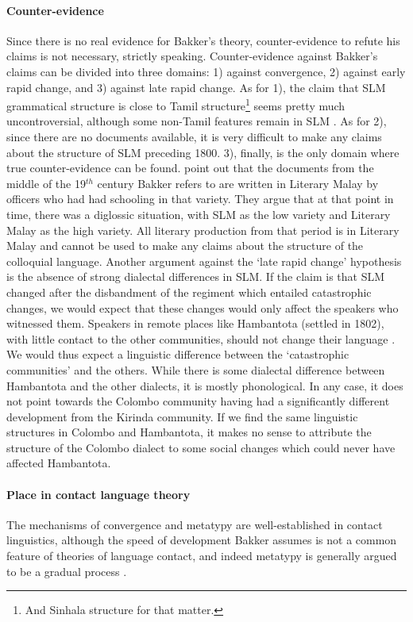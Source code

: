 \paragraph{Counter-evidence}
Since there is no real evidence for Bakker's theory, counter-evidence to refute his claims is not necessary, strictly speaking. Counter-evidence against Bakker's claims can be divided into three domains: 1) against convergence, 2) against early rapid change, and  3) against late rapid change. As for 1), the claim that SLM grammatical structure is close to Tamil structure\footnote{And Sinhala structure for that matter.} seems pretty much uncontroversial, although some non-Tamil features remain in SLM \citep{Slomanson2006cll}. As for 2), since there are no documents available, it is very difficult to make any claims about the structure of SLM preceding 1800. 3), finally, is the only domain where true counter-evidence can be found. \citet{SmithEtAl2006cll} point out that the documents from the middle of the 19$^{th}$ century Bakker refers to are written in Literary Malay by officers who had had schooling in that variety. They argue that at that point in time, there was a diglossic situation, with SLM as the low variety and Literary Malay as the high variety. All literary production from that period is in Literary Malay and cannot be used to make any claims about the structure of the colloquial language. Another argument against the `late rapid change' hypothesis is the absence of strong dialectal differences in SLM.
If the claim is that SLM changed after the disbandment of the regiment which entailed catastrophic changes, we would expect that these changes would only affect the speakers who witnessed them. Speakers in remote places like Hambantota (settled in 1802), with little contact to the other communities, should not change their language \citep[cf.][]{SmithRH}. We would thus expect a linguistic difference between the `catastrophic communities' and the others. While there is some dialectal difference between Hambantota and the other dialects, it is mostly phonological. In any case, it does not point towards the Colombo community having had a significantly different development from the Kirinda community. If we find the same linguistic structures in Colombo and Hambantota, it makes no sense to attribute the structure of the Colombo dialect to some social changes which could never have affected  Hambantota.
 
\paragraph{Place in contact language theory}
The mechanisms of convergence and metatypy are well-established in contact linguistics, although the speed of development Bakker assumes is not a common feature of theories of language contact, and indeed metatypy is generally argued to be a gradual process \citep[127]{Ross2007}.

